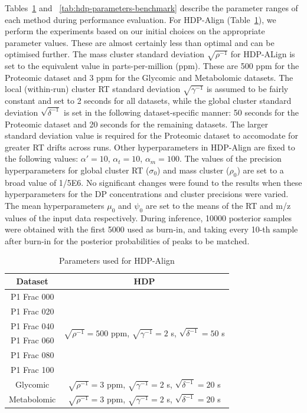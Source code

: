 Tables~\ref{tab:hdp-parameters-hdpalign} and ~\ref{tab:hdp-parameters-benchmark} describe the parameter ranges of each method during performance evaluation. For HDP-Align (Table~\ref{tab:hdp-parameters-hdpalign}), we perform the experiments based on our initial choices on the appropriate parameter values. These are almost certainly less than optimal and can be optimised further. The mass cluster standard deviation $\sqrt{\rho^{-1}}$ for HDP-ALign is set to the equivalent value in parts-per-million (ppm). These are 500 ppm for the Proteomic dataset and 3 ppm for the Glycomic and Metabolomic datasets. The local (within-run) cluster \ac{RT} standard deviation $\sqrt{\gamma^{-1}}$ is assumed to be fairly constant and set to 2 seconds for all datasets, while the global cluster standard deviation $\sqrt{\delta^{-1}}$ is set in the following dataset-specific manner: 50 seconds for the Proteomic dataset and 20 seconds for the remaining datasets. The larger standard deviation value is required for the Proteomic dataset to accomodate for greater \ac{RT} drifts across runs. Other hyperparameters in HDP-Align are fixed to the following values: $\alpha'=10$, $\alpha_t=10$, $\alpha_m=100$. The values of the precision hyperparameters for global cluster RT ($\sigma_0$) and mass cluster ($\rho_0$) are set to a broad value of 1/5E6. No significant changes were found to the results when these hyperparameters for the DP concentrations and cluster precisions were varied. The mean hyperparameters $\mu_0$ and $\psi_0$ are set to the means of the RT and m/z values of the input data respectively. During inference, 10000 posterior samples were obtained with the first 5000 used as burn-in, and taking every 10-th sample after burn-in for the posterior probabilities of peaks to be matched.

\begin{table}[!htbp]
\begin{centering}
\begin{tabular}{|c|c|}
\hline 
Dataset & HDP\tabularnewline
\hline 
\hline 
P1 Frac 000 & \multirow{6}{*}{$\sqrt{\rho^{-1}}=500$ ppm, $\sqrt{\gamma^{-1}}=2$ s, $\sqrt{\delta^{-1}}=50$
s}\tabularnewline
\cline{1-1} 
P1 Frac 020 & \tabularnewline
\cline{1-1} 
P1 Frac 040 & \tabularnewline
\cline{1-1} 
P1 Frac 060 & \tabularnewline
\cline{1-1} 
P1 Frac 080 & \tabularnewline
\cline{1-1} 
P1 Frac 100 & \tabularnewline
\hline 
Glycomic & $\sqrt{\rho^{-1}}=3$ ppm, $\sqrt{\gamma^{-1}}=2$ s, $\sqrt{\delta^{-1}}=20$
s\tabularnewline
\hline 
Metabolomic & $\sqrt{\rho^{-1}}=3$ ppm, $\sqrt{\gamma^{-1}}=2$ s, $\sqrt{\delta^{-1}}=20$
s\tabularnewline
\hline 
\end{tabular}
\par\end{centering}
\caption{Parameters used for HDP-Align\label{tab:hdp-parameters-hdpalign}}
\end{table}

